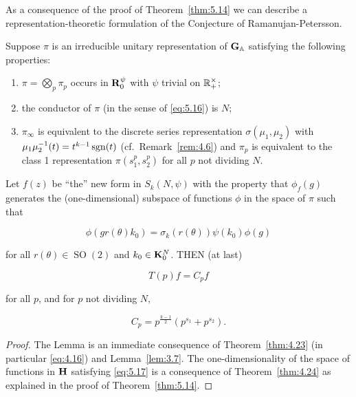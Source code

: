 As a consequence of the proof of Theorem~\ref{thm:5.14} we can describe a representation-theoretic formulation of the Conjecture of Ramanujan-Petersson.

\begin{lemma}\label{lem:5.16}

Suppose $\pi$ is an irreducible unitary representation of $\mathbf{G}_{\mathbb{A}}$ satisfying the following properties:

\begin{enumerate}[(1)]

\item $\pi = \bigotimes_p \pi_p$ occurs in $\mathbf{R}_0^{\psi}$ with $\psi$ trivial on $\mathbb{R}_+^{\times}$;

\item the conductor of $\pi$ (in the sense of \eqref{eq:5.16}) is $N$;

\item $\pi_{\infty}$ is equivalent to the discrete series representation $\sigma(\mu_1, \mu_2)$ with $\mu_1\mu_2^{-1}(t) = t^{k-1}\operatorname{sgn}(t)$ (cf.\ Remark~\ref{rem:4.6}) and $\pi_p$ is equivalent to the class 1 representation $\pi(s_1^p, s_2^p)$ for all $p$ not dividing $N$.

\end{enumerate}

Let $f(z)$ be ``the'' new form in $S_k(N, \psi)$ with the property that $\phi_f(g)$ generates the (one-dimensional) subspace of functions $\phi$ in the space of $\pi$ such that

\begin{equation}\label{eq:5.17}
\phi(gr(\theta)k_0) = \sigma_k(r(\theta))\psi(k_0)\phi(g)\tag{5.17}
\end{equation}

for all $r(\theta) \in \operatorname{SO}(2)$ and $k_0 \in \mathbf{K}_0^N$. THEN (at last)

\[
T(p)f = C_p f
\]

for all $p$, and for $p$ not dividing $N$,

\begin{equation}\label{eq:5.18}
C_p = p^{\frac{k-1}{2}}\left(p^{s_1} + p^{s_2}\right).\tag{5.18}
\end{equation}

\end{lemma}

\begin{proof}

The Lemma is an immediate consequence of Theorem~\ref{thm:4.23} (in particular \eqref{eq:4.16}) and Lemma~\ref{lem:3.7}. The one-dimensionality of the space of functions in $\mathbf{H}$ satisfying \eqref{eq:5.17} is a consequence of Theorem~\ref{thm:4.24} as explained in the proof of Theorem~\ref{thm:5.14}.

\end{proof}

